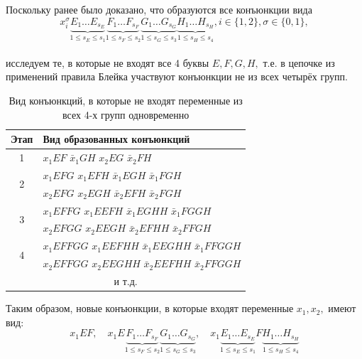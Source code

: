 \documentclass[12pt,a4paper,oneside,fleqn,leqno]{article}
\theoremstyle{definition}
\begin{document}
			Поскольку ранее было доказано, что образуются все конъюнкции вида
			\begin{equation}
				x_i^{\sigma} \underbrace{E_1\ldots E_{s_E}}_{1\leqslant s_E \leqslant s_1}\underbrace{F_1\ldots F_{s_F}}_{1\leqslant s_F \leqslant s_2}\underbrace{G_1\ldots G_{s_G}}_{1\leqslant s_G \leqslant s_3}\underbrace{H_1\ldots H_{s_H}}_{1\leqslant s_H \leqslant s_4}, i\in\{1,2\},\sigma\in\{0,1\},
			\end{equation}\\
			исследуем те, в которые не входят все 4 буквы $E, F, G, H,$ т.е. в цепочке из применений правила Блейка участвуют конъюнкции не из всех четырёх групп.
			\begin{table}[H]
				\centering
				\begin{tabular}{|c|p{4in}|}
					\hline
					Этап & Вид образованных конъюнкций\\
					\hline
					1 & $x_1EF$ $\bar{x}_1GH$ $x_2EG$ $\bar{x}_2FH$\\
					\hline
					\multirow{2}{*}{2} & $x_1EFG$ $x_1EFH$ $\bar{x}_1EGH$ $\bar{x}_1FGH$ \vspace{5pt}\\
					 & $x_2EFG$ $x_2EGH$ $\bar{x}_2EFH$ $\bar{x}_2FGH$\\
					\hline
					\multirow{2}{*}{3} & $x_1EFFG$ $x_1EEFH$ $\bar{x}_1EGHH$ $\bar{x}_1FGGH$ \vspace{5pt}\\
					 & $x_2EFGG$ $x_2EEGH$ $\bar{x}_2EFHH$ $\bar{x}_2FFGH$\\
					\hline
					\multirow{2}{*}{4} & $x_1EFFGG$ $x_1EEFHH$ $\bar{x}_1EEGHH$ $\bar{x}_1FFGGH$ \vspace{5pt}\\
					 & $x_2EFFGG$ $x_2EEGHH$ $\bar{x}_2EEFHH$ $\bar{x}_2FFGGH$\\
					\hline
					\multicolumn{2}{|c|}{и т.д.}\\
					\hline
				\end{tabular}
				\captionsetup{justification=centering}
				\caption{Вид конъюнкций, в которые не входят переменные из всех 4-х групп одновременно}
			\end{table}\par
			Таким образом, новые конъюнкции, в которые входят переменные $x_1, x_2,$ имеют вид:
			$$
				x_1EF, \quad x_1E\underbrace{F_1\ldots F_{s_F}}_{1 \leqslant s_F \leqslant s_2}\underbrace{G_1\ldots G_{s_G}}_{1 \leqslant s_G \leqslant s_3}, \quad x_1\underbrace{E_1\ldots E_{s_E}}_{1 \leqslant s_E \leqslant s_1}F\underbrace{H_1\ldots H_{s_H}}_{1 \leqslant s_H \leqslant s_4}
			$$
\end{document}
